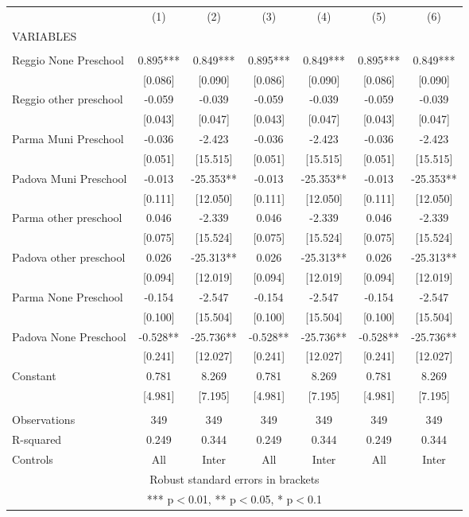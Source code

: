 \begin{tabular}{lcccccc} \hline
 & (1) & (2) & (3) & (4) & (5) & (6) \\
VARIABLES &  &  &  &  &  &  \\ \hline
 &  &  &  &  &  &  \\
Reggio None Preschool & 0.895*** & 0.849*** & 0.895*** & 0.849*** & 0.895*** & 0.849*** \\
 & [0.086] & [0.090] & [0.086] & [0.090] & [0.086] & [0.090] \\
Reggio other preschool & -0.059 & -0.039 & -0.059 & -0.039 & -0.059 & -0.039 \\
 & [0.043] & [0.047] & [0.043] & [0.047] & [0.043] & [0.047] \\
Parma Muni Preschool & -0.036 & -2.423 & -0.036 & -2.423 & -0.036 & -2.423 \\
 & [0.051] & [15.515] & [0.051] & [15.515] & [0.051] & [15.515] \\
Padova Muni Preschool & -0.013 & -25.353** & -0.013 & -25.353** & -0.013 & -25.353** \\
 & [0.111] & [12.050] & [0.111] & [12.050] & [0.111] & [12.050] \\
Parma other preschool & 0.046 & -2.339 & 0.046 & -2.339 & 0.046 & -2.339 \\
 & [0.075] & [15.524] & [0.075] & [15.524] & [0.075] & [15.524] \\
Padova other preschool & 0.026 & -25.313** & 0.026 & -25.313** & 0.026 & -25.313** \\
 & [0.094] & [12.019] & [0.094] & [12.019] & [0.094] & [12.019] \\
Parma None Preschool & -0.154 & -2.547 & -0.154 & -2.547 & -0.154 & -2.547 \\
 & [0.100] & [15.504] & [0.100] & [15.504] & [0.100] & [15.504] \\
Padova None Preschool & -0.528** & -25.736** & -0.528** & -25.736** & -0.528** & -25.736** \\
 & [0.241] & [12.027] & [0.241] & [12.027] & [0.241] & [12.027] \\
Constant & 0.781 & 8.269 & 0.781 & 8.269 & 0.781 & 8.269 \\
 & [4.981] & [7.195] & [4.981] & [7.195] & [4.981] & [7.195] \\
 &  &  &  &  &  &  \\
Observations & 349 & 349 & 349 & 349 & 349 & 349 \\
R-squared & 0.249 & 0.344 & 0.249 & 0.344 & 0.249 & 0.344 \\
 Controls & All & Inter & All & Inter & All & Inter \\ \hline
\multicolumn{7}{c}{ Robust standard errors in brackets} \\
\multicolumn{7}{c}{ *** p$<$0.01, ** p$<$0.05, * p$<$0.1} \\
\end{tabular}
